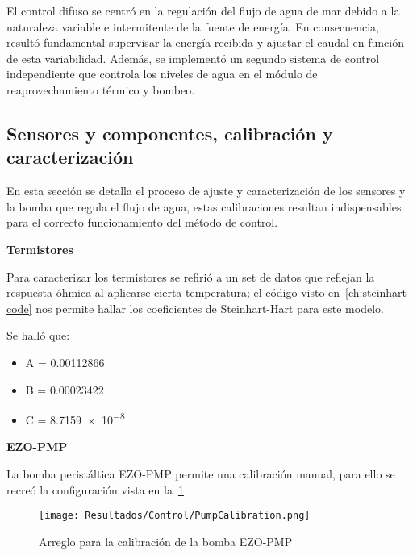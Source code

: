 		El control difuso se centró en la regulación del flujo de agua de mar debido a la naturaleza variable e intermitente de la fuente de energía. En consecuencia, resultó fundamental supervisar la energía recibida y ajustar el caudal en función de esta variabilidad. Además, se implementó un segundo sistema de control independiente que controla los niveles de agua en el módulo de reaprovechamiento térmico y bombeo.
		
		\subsection{Sensores y componentes, calibración y caracterización}\label{subsec:calibración}
		
			En esta sección se detalla el proceso de ajuste y caracterización de los sensores y la bomba que regula el flujo de agua, estas calibraciones resultan indispensables para el correcto funcionamiento del método de control.
			
			\textbf{Termistores}\par
			
			Para caracterizar los termistores se refirió a un set de datos que reflejan la respuesta óhmica al aplicarse cierta temperatura; el código visto en~\cref{ch:steinhart-code} nos permite hallar los coeficientes de Steinhart-Hart para este modelo.
			
			Se halló que:
			
			\begin{itemize}[columns=3]
				\item A = \num{0.00112866}
				\item B = \num{0.00023422}
				\item C = \num{8.7159e-8}
			\end{itemize}
			
			\textbf{EZO-PMP}\par
			
			La bomba peristáltica EZO-PMP permite una calibración manual, para ello se recreó la configuración vista en la~\cref{fig:Calibración-bomba}
			
			\begin{figure}[H]
				\centering
				\texttt{[image: Resultados/Control/PumpCalibration.png]}
				\caption{Arreglo para la calibración de la bomba EZO-PMP}
				\label{fig:Calibración-bomba}
			\end{figure}
		
